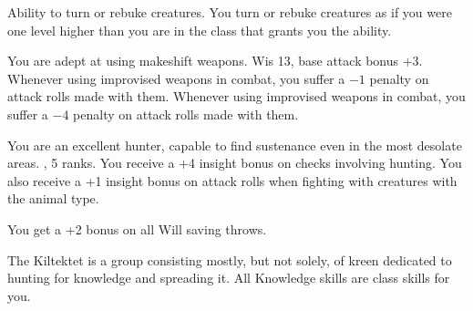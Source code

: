{Ability to turn or rebuke creatures.}
{You turn or rebuke creatures as if you were one level higher than you are in the class that grants you the ability.}

{You are adept at using makeshift weapons.}
{Wis 13, base attack bonus +3.}
{Whenever using improvised weapons in combat, you suffer a $-1$ penalty on attack rolls made with them.}
{Whenever using improvised weapons in combat, you suffer a $-4$ penalty on attack rolls made with them.}{}

{You are an excellent hunter, capable to find sustenance even in the most desolate areas.}
{,  5 ranks.}
{You receive a +4 insight bonus on  checks involving hunting. You also receive a +1 insight bonus on attack rolls when fighting with creatures with the animal type.}{}{}

{You get a +2 bonus on all Will saving throws.}


{The Kiltektet is a group consisting mostly, but not solely, of kreen dedicated to hunting for knowledge and spreading it.}{}
{All Knowledge skills are class skills for you.}{}{}

